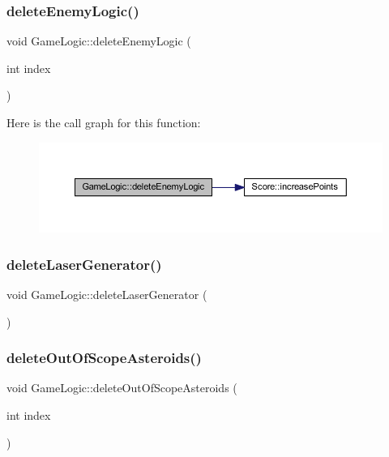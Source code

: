 \subsubsection{\texorpdfstring{delete\+Enemy\+Logic()}{deleteEnemyLogic()}}
{\footnotesize\ttfamily void Game\+Logic\+::delete\+Enemy\+Logic (\begin{DoxyParamCaption}\item[{int}]{index }\end{DoxyParamCaption})}

Here is the call graph for this function\+:\nopagebreak
\begin{figure}[H]
\begin{center}
\leavevmode
\includegraphics[width=350pt]{class_game_logic_a34fd5f74aec0365dff0631384740a45b_cgraph}
\end{center}
\end{figure}
\mbox{\label{class_game_logic_adc970904cd9d94e6e64b733863839ddf}} 
\subsubsection{\texorpdfstring{delete\+Laser\+Generator()}{deleteLaserGenerator()}}
{\footnotesize\ttfamily void Game\+Logic\+::delete\+Laser\+Generator (\begin{DoxyParamCaption}{ }\end{DoxyParamCaption})}

\mbox{\label{class_game_logic_ae2bb92c22bea679a7467c592f253263b}} 
\subsubsection{\texorpdfstring{delete\+Out\+Of\+Scope\+Asteroids()}{deleteOutOfScopeAsteroids()}}
{\footnotesize\ttfamily void Game\+Logic\+::delete\+Out\+Of\+Scope\+Asteroids (\begin{DoxyParamCaption}\item[{int}]{index }\end{DoxyParamCaption})}

